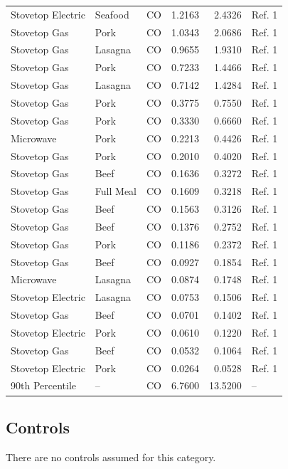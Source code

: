 \documentclass[
  11pt,
  oneside]{book}
\begin{document}
\begin{table}[H]
{\begin{tabular}[t]{lllrrl}
Stovetop Electric & Seafood & CO & 1.2163 & 2.4326 & Ref. 1\\
Stovetop Gas & Pork & CO & 1.0343 & 2.0686 & Ref. 1\\
Stovetop Gas & Lasagna & CO & 0.9655 & 1.9310 & Ref. 1\\
\addlinespace
Stovetop Gas & Pork & CO & 0.7233 & 1.4466 & Ref. 1\\
Stovetop Gas & Lasagna & CO & 0.7142 & 1.4284 & Ref. 1\\
Stovetop Gas & Pork & CO & 0.3775 & 0.7550 & Ref. 1\\
Stovetop Gas & Pork & CO & 0.3330 & 0.6660 & Ref. 1\\
Microwave & Pork & CO & 0.2213 & 0.4426 & Ref. 1\\
\addlinespace
Stovetop Gas & Pork & CO & 0.2010 & 0.4020 & Ref. 1\\
Stovetop Gas & Beef & CO & 0.1636 & 0.3272 & Ref. 1\\
Stovetop Gas & Full Meal & CO & 0.1609 & 0.3218 & Ref. 1\\
Stovetop Gas & Beef & CO & 0.1563 & 0.3126 & Ref. 1\\
Stovetop Gas & Beef & CO & 0.1376 & 0.2752 & Ref. 1\\
\addlinespace
Stovetop Gas & Pork & CO & 0.1186 & 0.2372 & Ref. 1\\
Stovetop Gas & Beef & CO & 0.0927 & 0.1854 & Ref. 1\\
Microwave & Lasagna & CO & 0.0874 & 0.1748 & Ref. 1\\
Stovetop Electric & Lasagna & CO & 0.0753 & 0.1506 & Ref. 1\\
Stovetop Gas & Beef & CO & 0.0701 & 0.1402 & Ref. 1\\
\addlinespace
Stovetop Electric & Pork & CO & 0.0610 & 0.1220 & Ref. 1\\
Stovetop Gas & Beef & CO & 0.0532 & 0.1064 & Ref. 1\\
Stovetop Electric & Pork & CO & 0.0264 & 0.0528 & Ref. 1\\
90th Percentile & -- & CO & 6.7600 & 13.5200 & --\\
\bottomrule
\end{tabular}}
\end{table}

\subsection{Controls}\label{controls}

There are no controls assumed for this category.
\end{document}
